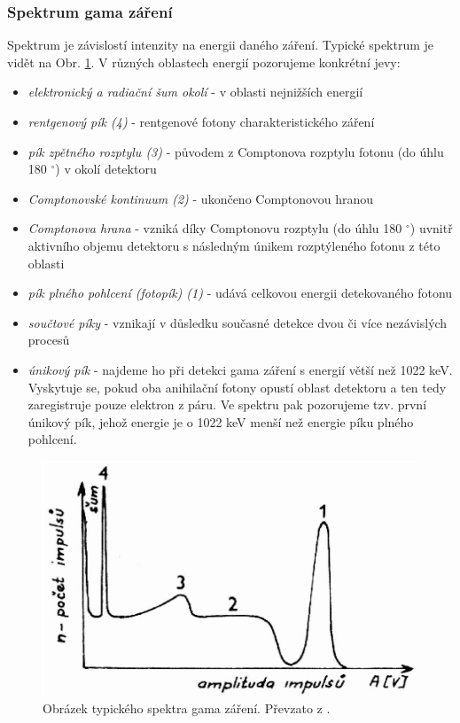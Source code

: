 \documentclass[english]{article}
\begin{document}
			\subsubsection{Spektrum gama záření}
				Spektrum je závislostí intenzity na energii daného záření. Typické spektrum je vidět na Obr. \ref{fig:s_spektrum}. V různých oblastech energií pozorujeme konkrétní jevy:
				\begin{itemize}
						\item \emph{elektronický a radiační šum okolí} - v oblasti nejnižších energií
						\item \emph{rentgenový pík (4)} - rentgenové fotony charakteristického záření
						\item \emph{pík zpětného rozptylu (3)} - původem z Comptonova rozptylu fotonu (do úhlu 180 $^\circ$) v okolí detektoru 
						\item \emph{Comptonovské kontinuum (2)} - ukončeno Comptonovou hranou
						\item \emph{Comptonova hrana} -  vzniká díky Comptonovu rozptylu (do úhlu 180 $^\circ$) uvnitř aktivního objemu detektoru s následným únikem rozptýleného fotonu z této oblasti
						\item \emph{pík plného pohlcení (fotopík) (1)} - udává celkovou energii detekovaného fotonu
						\item \emph{součtové píky} - vznikají v důsledku současné detekce dvou či více nezávislých procesů
						\item \emph{únikový pík} - najdeme ho při detekci gama záření s energií větší než 1022 keV. Vyskytuje se, pokud oba anihilační fotony opustí oblast detektoru a ten tedy zaregistruje pouze elektron z páru. Ve spektru pak pozorujeme tzv. první únikový pík,  jehož energie je o 1022 keV menší než energie píku plného pohlcení.
				\end{itemize}
				
			    \begin{figure}[h]
				\begin{center}
					\includegraphics[width=0.6\linewidth]{att/spektrum.jpg}
					\caption{Obrázek typického spektra gama záření. Převzato z \cite{bib:zadani}.}
					\label{fig:s_spektrum}
				\end{center}
				\end{figure}		
			
\end{document}
